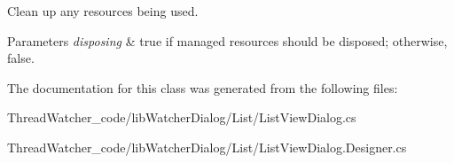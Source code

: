 Clean up any resources being used. 


\begin{DoxyParams}{Parameters}
{\em disposing} & true if managed resources should be disposed; otherwise, false.\\
\hline
\end{DoxyParams}


The documentation for this class was generated from the following files\+:\begin{DoxyCompactItemize}
\item 
Thread\+Watcher\+\_\+code/lib\+Watcher\+Dialog/\+List/List\+View\+Dialog.\+cs\item 
Thread\+Watcher\+\_\+code/lib\+Watcher\+Dialog/\+List/List\+View\+Dialog.\+Designer.\+cs\end{DoxyCompactItemize}
